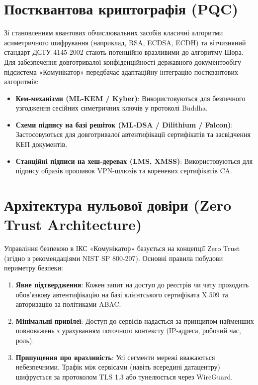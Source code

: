 \section{Постквантова криптографія (PQC)}
Зі становленням квантових обчислювальних засобів класичні алгоритми асиметричного шифрування (наприклад, RSA, ECDSA, ECDH) та вітчизняний стандарт ДСТУ 4145-2002 стають потенційно вразливими до алгоритму Шора. Для забезпечення довготривалої конфіденційності державного документообігу підсистема «Комунікатор» передбачає адаптаційну інтеграцію постквантових алгоритмів:
\begin{itemize}
    \item \textbf{Кем-механізми (ML-KEM / Kyber)}: Використовуються для безпечного узгодження сесійних симетричних ключів у протоколі Buddha.
    \item \textbf{Схеми підпису на базі решіток (ML-DSA / Dilithium / Falcon)}: Застосовуються для довготривалої автентифікації сертифікатів та засвідчення КЕП документів.
    \item \textbf{Станційні підписи на хеш-деревах (LMS, XMSS)}: Використовуються для підпису образів прошивок VPN-шлюзів та кореневих сертифікатів CA.
\end{itemize}

\section{Архітектура нульової довіри (Zero Trust Architecture)}
Управління безпекою в ІКС «Комунікатор» базується на концепції Zero Trust (згідно з рекомендаціями NIST SP 800-207). Основні правила побудови периметру безпеки:
\begin{enumerate}
    \item \textbf{Явне підтвердження}: Кожен запит на доступ до реєстрів чи чату проходить обов'язкову автентифікацію на базі клієнтського сертифіката X.509 та авторизацію за політиками ABAC.
    \item \textbf{Мінімальні привілеї}: Доступ до сервісів надається за принципом найменших повноважень з урахуванням поточного контексту (IP-адреса, робочий час, роль).
    \item \textbf{Припущення про вразливість}: Усі сегменти мережі вважаються небезпечними. Трафік між сервісами (навіть всередині датацентру) шифрується за протоколом TLS 1.3 або тунелюється через WireGuard.
\end{enumerate}

